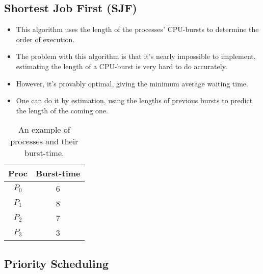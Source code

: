 \documentclass{beamer}
\begin{document}
\subsection{Shortest Job First (SJF)}

\begin{frame}{\insertsubsectionhead}
  \begin{itemize}
    \item This algorithm uses the length of the processes' CPU-bursts to 
      determine the order of execution.

    \item The problem with this algorithm is that it's nearly impossible to 
      implement, estimating the length of a CPU-burst is very hard to do 
      accurately.

    \item However, it's provably optimal, giving the minimum average waiting 
      time.

    \item One can do it by estimation, using the lengths of previous bursts to 
      predict the length of the coming one.

  \end{itemize}
\end{frame}

\begin{frame}{\insertsubsectionhead}
  \begin{table}
    \begin{tabular}{cc}
      \textbf{Proc} & \textbf{Burst-time} \\
      \toprule
      \(P_0\)   & 6 \\
      \(P_1\)   & 8 \\
      \(P_2\)   & 7 \\
      \(P_3\)   & 3 \\
      \bottomrule
    \end{tabular}
    \caption{An example of processes and their burst-time.}
  \end{table}
\end{frame}

\subsection{Priority Scheduling}
\end{document}

